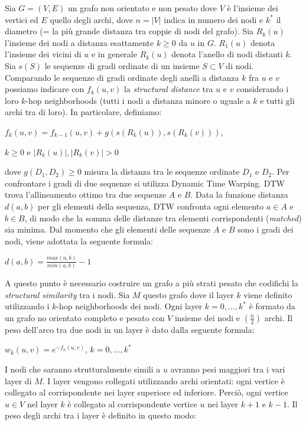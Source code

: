 \documentclass[11pt]{article}
\begin{document}
Sia $G = (V,E)$ un grafo non orientato e non pesato dove $V$ è l'insieme dei vertici ed $E$ quello degli archi, dove $n = |V|$ indica in numero dei nodi e $k^*$ il diametro (= la più grande distanza tra coppie di nodi del grafo). Sia $R_k(u)$ l'insieme dei nodi a distanza esattamente $k \geq 0$ da $u$ in $G$. $R_1(u)$ denota l'insieme dei vicini di $u$ e in generale $R_k(u)$ denota l'anello di nodi distanti $k$. Sia $s(S)$ le sequenze di gradi ordinate di un insieme $S \subset V$ di nodi. Comparando le sequenze di gradi ordinate degli anelli a distanza $k$ fra $u$ e $v$ possiamo indicare con $f_k(u,v)$ la \textit{structural distance} tra $u$ e $v$ considerando i loro $k$-hop neighborhoods (tutti i nodi a distanza minore o uguale a $k$ e tutti gli archi tra di loro). In particolare, definiamo:
\begin{center}
$f_k(u,v) = f_{k-1}(u,v) + g(s(R_k(u)),s(R_k(v)))$, 
\end{center}
\begin{center}
$k \geq 0$ e $|R_k(u)|, |R_k(v)| > 0$
\end{center}
dove $g(D_1,D_2) \geq 0$ misura la distanza tra le sequenze ordinate $D_1$ e $D_2$. Per confrontare i gradi di due sequenze si utilizza Dynamic Time Warping. DTW trova l'allineamento ottimo tra due sequenze $A$ e $B$. Data la funzione distanza $d(a,b)$ per gli elementi della sequenza, DTW confronta ogni elemento $a \in A$ e $b \in B$, di modo che la somma delle distanze tra elementi corrispondenti (\textit{matched}) sia minima. Dal momento che gli elementi delle sequenze $A$ e $B$ sono i gradi dei nodi, viene adottata la seguente formula:
\begin{center}
$d(a,b) = \displaystyle{\frac{max(a,b)}{min(a,b)}}-1$
\end{center}
A questo punto è necessario costruire un grafo a più strati pesato che codifichi la \textit{structural similarity} tra i nodi. Sia $M$ questo grafo dove il layer $k$ viene definito utilizzando i $k$-hop neighborhoods dei nodi. Ogni layer $k = 0,...,k^*$ è formato da un grafo no orientato completo e pesato con $V$ insieme dei nodi e $\displaystyle{\left(\frac{n}{2}\right)}$ archi. Il peso dell'arco tra due nodi in un layer è dato dalla seguente formula:
\begin{center}
$w_k(u,v) = e^{-f_k(u,v)}$, $k = 0,...,k^*$
\end{center}
I nodi che saranno strutturalmente simili a $u$ avranno pesi maggiori tra i vari layer di $M$. I layer vengono collegati utilizzando archi orientati: ogni vertice è collegato al corrispondente nei layer superiore ed inferiore. Perciò, ogni vertice $u \in V$ nel layer $k$ è collegato al corrispondente vertice $u$ nei layer $k+1$ e $k-1$. Il peso degli archi tra i layer è definito in questo modo:
\end{document}
